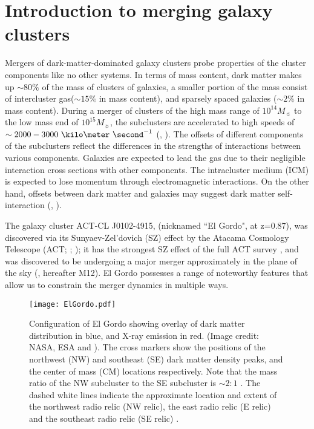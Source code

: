 \section{Introduction to merging galaxy clusters} 
Mergers of dark-matter-dominated galaxy clusters probe properties
of the cluster components like no other systems. 
In terms of mass content, dark matter makes up $\sim80\%$ of the mass of clusters
of galaxies, a smaller portion of the mass consist of intercluster
gas($\sim15\%$ in mass content), and sparsely spaced galaxies ($\sim2\%$ in mass content). During a merger of
clusters of the high mass range of $10^{14} M_{\sun}$ to the low mass end of
$10^{15} M_{\sun}$, the subclusters are accelerated to high speeds of 
$\sim 2000 - 3000~\kilo \meter~\second^{-1}$ (\citealt{Lage2014},
\citealt{Dawson12}). The offsets of
different components of the subclusters reflect the differences in the
strengths of interactions between various components. Galaxies are
expected to lead the gas due to their negligible interaction cross
sections with other components. The intracluster medium (ICM) is expected to lose
momentum through electromagnetic interactions. On the other hand, offsets
between dark matter and galaxies may suggest dark matter self-interaction
(\citealt{Kahlhoefer14}, \citealt{Randall2008d}).  
\par
The galaxy cluster ACT-CL J0102-4915, (nicknamed ``El Gordo", at z=0.87),
was discovered via its Sunyaev-Zel'dovich (SZ) effect by the Atacama Cosmology Telescope (ACT;
\citealt{Menanteau2010}; \citealt{Marriage11}); it has the strongest SZ
effect of the full ACT survey \citep{Hasselfield2013}, and was discovered
to be undergoing a major merger approximately in the plane of the sky
(\citealt{M12}, hereafter M12). El Gordo possesses a range of noteworthy features that allow us to constrain the merger dynamics in multiple ways. 
\begin{figure*}
	\texttt{[image: ElGordo.pdf]}
	\caption{Configuration of El Gordo showing overlay of dark
		matter distribution in blue, and X-ray emission in red. 
		(Image credit: NASA, ESA and \citealt{Jee13}). 
		The cross markers show the positions of the northwest (NW) and
		southeast (SE) dark matter density peaks, and the center of mass (CM)
		locations respectively. Note that the mass ratio of the NW subcluster
		to the SE subcluster is $\sim 2:1$ \citep{Jee13}. 
		The dashed white lines indicate the approximate location and extent of the northwest radio relic (NW relic), the east radio relic (E relic) and the
		southeast radio relic (SE relic) \citep{L13}.
		\label{fig:config}
	}
\end{figure*}
